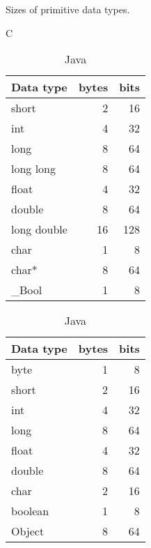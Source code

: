 \documentclass[12pt,letterpaper]{article}
\begin{document}
		\begin{table}[H]
		    \caption{Sizes of primitive data types.}
		    \label{table:pri}
		    \centering
		    \begin{subtable}[t]{.33\linewidth}
		      \centering
		        \caption{C}
		        \label{table:pri-c}
					\begin{tabular}{l r r}
						\toprule
						Data type & bytes & bits\\
						\midrule
						short        & 2 &       16 \\
						int          & 4 &       32 \\
						long         & 8 &       64 \\
						long long    & 8 &       64 \\
						float        & 4 &       32 \\
						double       & 8 &       64 \\
						long double  & 16 &      128 \\
						char         & 1 &        8 \\
						char*        & 8 &       64 \\
						\_Bool        & 1 &        8 \\
						\bottomrule
		        \end{tabular}
		    \end{subtable}%
		    \begin{subtable}[t]{.33\linewidth}
		      \centering
		        \caption{Java}
		        \label{table:pri-java}
					\begin{tabular}{l r r}
						\toprule
						Data type & bytes & bits\\
						\midrule
					  byte         & 1 &        8 \\
					  short        & 2 &       16 \\
					  int          & 4 &       32 \\
					  long         & 8 &       64 \\
					  float        & 4 &       32 \\
					  double       & 8 &       64 \\
					  char         & 2 &       16 \\
					  boolean      & 1 &        8 \\
					  Object       & 8 &       64 \\
					  \bottomrule
		        \end{tabular}%
		    \end{subtable} 
		    \begin{subtable}[t]{.33\linewidth}

\end{subtable}
\end{table}
\end{document}
